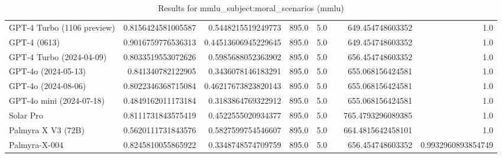 \begin{table}[htp]
{\begin{tabular}{lrrrrrrr}
GPT-4 Turbo (1106 preview) & 0.8156424581005587 & 0.5448215519249773 & 895.0 & 5.0 &  & 649.454748603352 & 1.0 \\
GPT-4 (0613) & 0.9016759776536313 & 0.44513606945229645 & 895.0 & 5.0 &  & 649.454748603352 & 1.0 \\
GPT-4 Turbo (2024-04-09) & 0.8033519553072626 & 0.5985688052363902 & 895.0 & 5.0 &  & 656.454748603352 & 1.0 \\
GPT-4o (2024-05-13) & 0.841340782122905 & 0.3436078146183291 & 895.0 & 5.0 &  & 655.068156424581 & 1.0 \\
GPT-4o (2024-08-06) & 0.8022346368715084 & 0.46217673823820143 & 895.0 & 5.0 &  & 655.068156424581 & 1.0 \\
GPT-4o mini (2024-07-18) & 0.4849162011173184 & 0.3183864769322912 & 895.0 & 5.0 &  & 655.068156424581 & 1.0 \\
Solar Pro & 0.8111731843575419 & 0.4522555020934377 & 895.0 & 5.0 &  & 765.4793296089385 & 1.0 \\
Palmyra X V3 (72B) & 0.5620111731843576 & 0.5827599754546607 & 895.0 & 5.0 &  & 664.4815642458101 & 1.0 \\
Palmyra-X-004 & 0.8245810055865922 & 0.3348748574709759 & 895.0 & 5.0 &  & 656.454748603352 & 0.9932960893854749 \\
\bottomrule
\end{tabular}}
\caption{Results for mmlu_subject:moral_scenarios (mmlu)}
\label{fig:mmlu_subject:moral_scenarios (mmlu)}
\end{table}